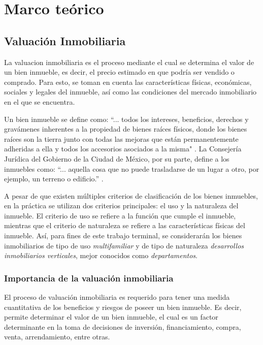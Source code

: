 
\chapter{\textcolor{azulescom}{Marco teórico}}

\section{Valuación Inmobiliaria}
La \gls{valuacion} inmobiliaria es el proceso mediante el cual se determina el valor
de un bien inmueble, es decir, el precio estimado en que podría ser vendido o
comprado. Para esto, se toman en cuenta las características físicas,
económicas, sociales y legales del inmueble, así como las condiciones del
mercado inmobiliario en el que se encuentra.

Un bien \gls{inmueble} se define como: ``... todos los intereses, beneficios, derechos y
gravámenes inherentes a la propiedad de bienes raíces físicos, donde los bienes
raíces son la tierra junto con todas las mejoras que están permanentemente
adheridas a ella y todos los accesorios asociados a la misma" \cite{pagourtzi2003}.
La Consejería Jurídica del Gobierno de la Ciudad de México, por su parte, define
a los inmuebles como: ``... aquella cosa que no puede trasladarse de un lugar a
otro, por ejemplo, un terreno o edificio.'' \cite{cdmx2014inmueble}.

A pesar de que existen múltiples criterios de clasificación de los bienes inmuebles,
en la práctica se utilizan dos criterios principales: el uso y la naturaleza del
inmueble. El criterio de uso se refiere a la función que cumple el inmueble,
mientras que el criterio de naturaleza se refiere a las características físicas
del inmueble. Así, para fines de este trabajo terminal, se considerarán los bienes
inmobiliarios de tipo de uso \textit{multifamiliar} y de tipo de naturaleza
\textit{desarrollos inmobiliarios verticales}, mejor conocidos como \textit{departamentos}.

\subsection{Importancia de la valuación inmobiliaria}
El proceso de valuación inmobiliaria es requerido para tener una medida cuantitativa
de los beneficios y riesgos de poseer un bien inmueble. Es decir, permite
determinar el valor de un bien inmueble, el cual es un factor determinante en
la toma de decisiones de inversión, financiamiento, compra, venta, arrendamiento,
entre otras.

